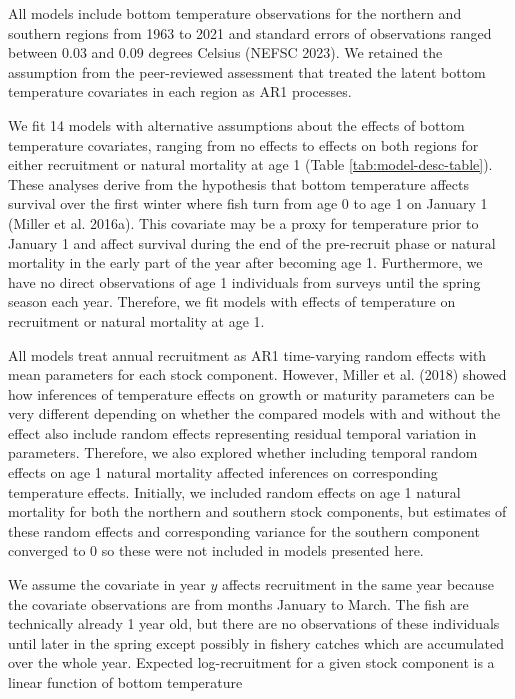 \documentclass[
]{article}
\begin{document}
All models include bottom temperature observations for the northern and southern regions from 1963 to 2021 and standard errors of observations ranged between 0.03 and 0.09 degrees Celsius (NEFSC 2023). We retained the assumption from the peer-reviewed assessment that treated the latent bottom temperature covariates in each region as AR1 processes.

We fit 14 models with alternative assumptions about the effects of bottom temperature covariates, ranging from no effects to effects on both regions for either recruitment or natural mortality at age 1 (Table \ref{tab:model-desc-table}). These analyses derive from the hypothesis that bottom temperature affects survival over the first winter where fish turn from age 0 to age 1 on January 1 (Miller et al. 2016a). This covariate may be a proxy for temperature prior to January 1 and affect survival during the end of the pre-recruit phase or natural mortality in the early part of the year after becoming age 1. Furthermore, we have no direct observations of age 1 individuals from surveys until the spring season each year. Therefore, we fit models with effects of temperature on recruitment or natural mortality at age 1.

All models treat annual recruitment as AR1 time-varying random effects with mean parameters for each stock component. However, Miller et al. (2018) showed how inferences of temperature effects on growth or maturity parameters can be very different depending on whether the compared models with and without the effect also include random effects representing residual temporal variation in parameters. Therefore, we also explored whether including temporal random effects on age 1 natural mortality affected inferences on corresponding temperature effects. Initially, we included random effects on age 1 natural mortality for both the northern and southern stock components, but estimates of these random effects and corresponding variance for the southern component converged to 0 so these were not included in models presented here.

We assume the covariate in year \(y\) affects recruitment in the same year because the covariate observations are from months January to March. The fish are technically already 1 year old, but there are no observations of these individuals until later in the spring except possibly in fishery catches which are accumulated over the whole year. Expected log-recruitment for a given stock component is a linear function of bottom temperature
\end{document}
